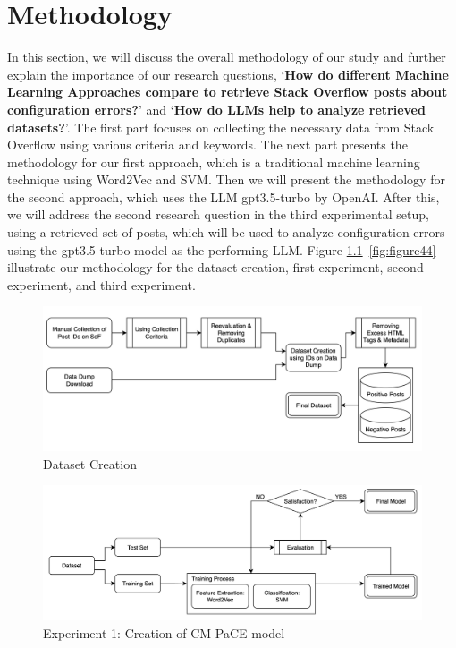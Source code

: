 \documentclass[english,bachelor]{swsLeipzig}
\begin{document}
\chapter{Methodology}\label{methodology}
In this section, we will discuss the overall methodology of our study and further explain the importance of our research 
questions, `\textbf{How do different Machine 
Learning Approaches compare to retrieve Stack Overflow posts about configuration errors?}' and `\textbf{How do LLMs help to analyze retrieved datasets?}'. The first part focuses on collecting the necessary data from Stack Overflow using various criteria and keywords. The next part presents the methodology for our first approach, which is a traditional machine learning technique using Word2Vec and SVM. Then we will present the methodology for the second approach, which uses the LLM gpt3.5-turbo by OpenAI. After this, we will address the second research question in the third experimental setup, using a retrieved set of posts, which will be used to analyze configuration errors using the gpt3.5-turbo model as the performing LLM. Figure \ref{fig:figure41}--\ref{fig:figure44} illustrate our methodology for the dataset creation, first experiment, second experiment, and third experiment.

\begin{figure}[h]
  \includegraphics[width=1\textwidth]{images/figure1.png}
  \caption{Dataset Creation}
  \label{fig:figure41}
\end{figure}

\begin{figure}[h]
  \includegraphics[width=1\textwidth]{images/figure2.png}
  \caption{Experiment 1: Creation of CM-PaCE model}
  \label{fig:figure42}
\end{figure}
\end{document}
